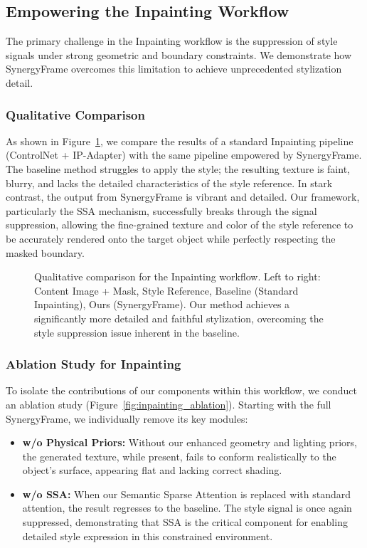 \documentclass[letterpaper]{article} %
\begin{document}
\subsection{Empowering the Inpainting Workflow}
\label{sec:exp_inpainting}

The primary challenge in the Inpainting workflow is the suppression of style signals under strong geometric and boundary constraints. We demonstrate how SynergyFrame overcomes this limitation to achieve unprecedented stylization detail.

\subsubsection{Qualitative Comparison}
As shown in Figure~\ref{fig:inpainting_comparison}, we compare the results of a standard Inpainting pipeline (ControlNet + IP-Adapter) with the same pipeline empowered by SynergyFrame. The baseline method struggles to apply the style; the resulting texture is faint, blurry, and lacks the detailed characteristics of the style reference. In stark contrast, the output from SynergyFrame is vibrant and detailed. Our framework, particularly the SSA mechanism, successfully breaks through the signal suppression, allowing the fine-grained texture and color of the style reference to be accurately rendered onto the target object while perfectly respecting the masked boundary.

\begin{figure}[h]
  \centering
  \caption{Qualitative comparison for the Inpainting workflow. Left to right: Content Image + Mask, Style Reference, Baseline (Standard Inpainting), Ours (SynergyFrame). Our method achieves a significantly more detailed and faithful stylization, overcoming the style suppression issue inherent in the baseline.}
  \label{fig:inpainting_comparison}
\end{figure}

\subsubsection{Ablation Study for Inpainting}
To isolate the contributions of our components within this workflow, we conduct an ablation study (Figure~\ref{fig:inpainting_ablation}). Starting with the full SynergyFrame, we individually remove its key modules:
\begin{itemize}
    \item \textbf{w/o Physical Priors:} Without our enhanced geometry and lighting priors, the generated texture, while present, fails to conform realistically to the object's surface, appearing flat and lacking correct shading.
    \item \textbf{w/o SSA:} When our Semantic Sparse Attention is replaced with standard attention, the result regresses to the baseline. The style signal is once again suppressed, demonstrating that SSA is the critical component for enabling detailed style expression in this constrained environment.
\end{itemize}
\end{document}
